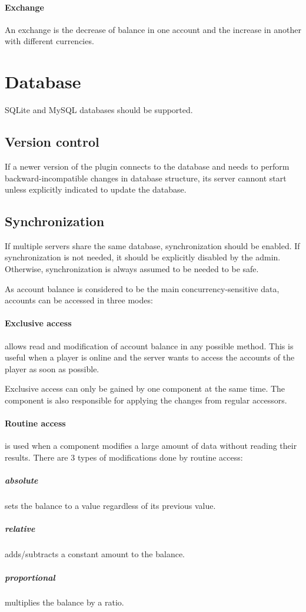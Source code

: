 \documentclass{report}
\begin{document}
				\paragraph{Exchange} An exchange is the decrease of balance in one account and the increase in another with different currencies.

		\section{Database}

			SQLite and MySQL databases should be supported.

			\subsection{Version control}

				If a newer version of the plugin connects to the database and needs to perform backward-incompatible changes in database structure,
				its server cannont start unless explicitly indicated to update the database.

			\subsection{Synchronization}
				If multiple servers share the same database, synchronization should be enabled.
				If synchronization is not needed, it should be explicitly disabled by the admin.
				Otherwise, synchronization is always assumed to be needed to be safe.

				As account balance is considered to be the main concurrency-sensitive data, accounts can be accessed in three modes:

				\paragraph{Exclusive access} allows read and modification of account balance in any possible method.
					This is useful when a player is online and the server wants to access the accounts of the player as soon as possible.

					Exclusive access can only be gained by one component at the same time.
					The component is also responsible for applying the changes from regular accessors.

				\paragraph{Routine access} is used when a component modifies a large amount of data without reading their results.
					There are 3 types of modifications done by routine access:
					\subparagraph{absolute} sets the balance to a value regardless of its previous value.
					\subparagraph{relative} adds/subtracts a constant amount to the balance.
					\subparagraph{proportional} multiplies the balance by a ratio.
\end{document}
